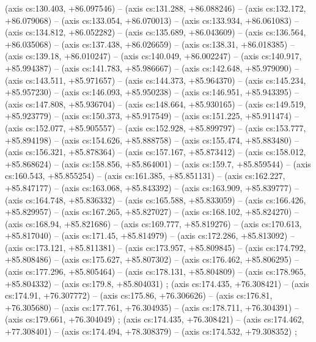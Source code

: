     (axis cs:130.403,    +86.097546) --  (axis cs:131.288,    +86.088246) --  (axis cs:132.172,    +86.079068) --  (axis cs:133.054,    +86.070013) --  (axis cs:133.934,    +86.061083) --  (axis cs:134.812,    +86.052282) --  (axis cs:135.689,    +86.043609) --  (axis cs:136.564,    +86.035068) --  (axis cs:137.438,    +86.026659) --  (axis cs:138.31,    +86.018385) --  (axis cs:139.18,    +86.010247) --  (axis cs:140.049,    +86.002247) --  (axis cs:140.917,    +85.994387) --  (axis cs:141.783,    +85.986667) --  (axis cs:142.648,    +85.979090) --  (axis cs:143.511,    +85.971657) --  (axis cs:144.373,    +85.964370) --  (axis cs:145.234,    +85.957230) --  (axis cs:146.093,    +85.950238) --  (axis cs:146.951,    +85.943395) --  (axis cs:147.808,    +85.936704) --  (axis cs:148.664,    +85.930165) --  (axis cs:149.519,    +85.923779) --  (axis cs:150.373,    +85.917549) --  (axis cs:151.225,    +85.911474) --  (axis cs:152.077,    +85.905557) --  (axis cs:152.928,    +85.899797) --  (axis cs:153.777,    +85.894198) --  (axis cs:154.626,    +85.888758) --  (axis cs:155.474,    +85.883480) --  (axis cs:156.321,    +85.878364) --  (axis cs:157.167,    +85.873412) --  (axis cs:158.012,    +85.868624) --  (axis cs:158.856,    +85.864001) --  (axis cs:159.7,    +85.859544) --  (axis cs:160.543,    +85.855254) --  (axis cs:161.385,    +85.851131) --  (axis cs:162.227,    +85.847177) --  (axis cs:163.068,    +85.843392) --  (axis cs:163.909,    +85.839777) --  (axis cs:164.748,    +85.836332) --  (axis cs:165.588,    +85.833059) --  (axis cs:166.426,    +85.829957) --  (axis cs:167.265,    +85.827027) --  (axis cs:168.102,    +85.824270) --  (axis cs:168.94,    +85.821686) --  (axis cs:169.777,    +85.819276) --  (axis cs:170.613,    +85.817040) --  (axis cs:171.45,    +85.814979) --  (axis cs:172.286,    +85.813092) --  (axis cs:173.121,    +85.811381) --  (axis cs:173.957,    +85.809845) --  (axis cs:174.792,    +85.808486) --  (axis cs:175.627,    +85.807302) --  (axis cs:176.462,    +85.806295) --  (axis cs:177.296,    +85.805464) --  (axis cs:178.131,    +85.804809) --  (axis cs:178.965,    +85.804332) --  (axis cs:179.8,    +85.804031) ;
    (axis cs:174.435,    +76.308421) --  (axis cs:174.91,    +76.307772) --  (axis cs:175.86,    +76.306626) --  (axis cs:176.81,    +76.305680) --  (axis cs:177.761,    +76.304935) --  (axis cs:178.711,    +76.304391) --  (axis cs:179.661,    +76.304049) ;
    (axis cs:174.435,    +76.308421) --  (axis cs:174.462,    +77.308401) --  (axis cs:174.494,    +78.308379) --  (axis cs:174.532,    +79.308352) ;
